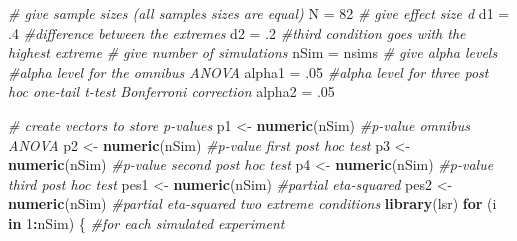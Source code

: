 \documentclass[]{book}
\newenvironment{Shaded}{\begin{snugshade}}{\end{snugshade}}
\newcommand{\CommentTok}[1]{\textcolor[rgb]{0.56,0.35,0.01}{\textit{#1}}}
\newcommand{\ControlFlowTok}[1]{\textcolor[rgb]{0.13,0.29,0.53}{\textbf{#1}}}
\newcommand{\DecValTok}[1]{\textcolor[rgb]{0.00,0.00,0.81}{#1}}
\newcommand{\FloatTok}[1]{\textcolor[rgb]{0.00,0.00,0.81}{#1}}
\newcommand{\KeywordTok}[1]{\textcolor[rgb]{0.13,0.29,0.53}{\textbf{#1}}}
\newcommand{\NormalTok}[1]{#1}
\newcommand{\OperatorTok}[1]{\textcolor[rgb]{0.81,0.36,0.00}{\textbf{#1}}}
\newcommand{\StringTok}[1]{\textcolor[rgb]{0.31,0.60,0.02}{#1}}
\begin{document}
\begin{Shaded}
\begin{Highlighting}[]
\CommentTok{# give sample sizes (all samples sizes are equal)}
\NormalTok{N =}\StringTok{ }\DecValTok{82}
\CommentTok{# give effect size d}
\NormalTok{d1 =}\StringTok{ }\FloatTok{.4} \CommentTok{#difference between the extremes}
\NormalTok{d2 =}\StringTok{ }\FloatTok{.2} \CommentTok{#third condition goes with the highest extreme}
\CommentTok{# give number of simulations}
\NormalTok{nSim =}\StringTok{ }\NormalTok{nsims}
\CommentTok{# give alpha levels}
\CommentTok{#alpha level for the omnibus ANOVA}
\NormalTok{alpha1 =}\StringTok{ }\FloatTok{.05} 
\CommentTok{#alpha level for three post hoc one-tail t-test Bonferroni correction}
\NormalTok{alpha2 =}\StringTok{ }\FloatTok{.05} 

\CommentTok{# create vectors to store p-values}
\NormalTok{p1 <-}\StringTok{ }\KeywordTok{numeric}\NormalTok{(nSim) }\CommentTok{#p-value omnibus ANOVA}
\NormalTok{p2 <-}\StringTok{ }\KeywordTok{numeric}\NormalTok{(nSim) }\CommentTok{#p-value first post hoc test}
\NormalTok{p3 <-}\StringTok{ }\KeywordTok{numeric}\NormalTok{(nSim) }\CommentTok{#p-value second post hoc test}
\NormalTok{p4 <-}\StringTok{ }\KeywordTok{numeric}\NormalTok{(nSim) }\CommentTok{#p-value third post hoc test}
\NormalTok{pes1 <-}\StringTok{ }\KeywordTok{numeric}\NormalTok{(nSim) }\CommentTok{#partial eta-squared}
\NormalTok{pes2 <-}\StringTok{ }\KeywordTok{numeric}\NormalTok{(nSim) }\CommentTok{#partial eta-squared two extreme conditions}
\KeywordTok{library}\NormalTok{(lsr)}
\ControlFlowTok{for}\NormalTok{ (i }\ControlFlowTok{in} \DecValTok{1}\OperatorTok{:}\NormalTok{nSim) \{}
\CommentTok{#for each simulated experiment}


\end{Highlighting}
\end{Shaded}
\end{document}
